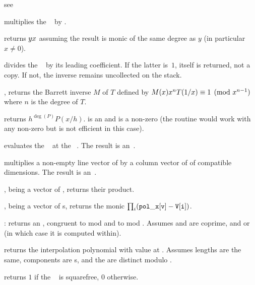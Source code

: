  see 

 multiplies the ~
by .

 returns $y\*x$ assuming the
result is monic of the same degree as $y$ (in particular $x\neq 0$).


 divides the ~ by its
leading coefficient. If the latter is~$1$,  itself is returned, not a
copy. If not, the inverse remains uncollected on the stack.

, returns the Barrett inverse
$M$ of $T$ defined by $M(x)\*x^n\*T(1/x)\equiv 1\pmod{x^{n-1}}$ where $n$ is
the degree of $T$.

 returns $h^{\deg(P)} P(x/h)$.
 is an  and  is a non-zero  (the routine would
work with any non-zero  but is not efficient in this case).

 evaluates the ~
at the ~. The result is an~.

 multiplies a non-empty line
vector of by a column vector of  of compatible dimensions.
The result is an~.

,  being a vector of ,
returns their product.

,  being a vector
of s, returns the monic 
$\prod_i ({\tt pol\_x[v]} - {\tt V[i]})$.

:
returns an , congruent to  mod  and to  mod
. Assumes  and  are coprime, and 
or  (in which case it is computed within).

 returns the 
interpolation polynomial with value  at . Assumes lengths
are the same, components are s, and the  are distinct
modulo .

 returns $1$ if the
~ is squarefree, $0$ otherwise.

